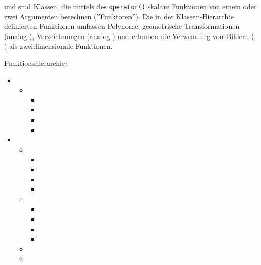 \hypertarget{Funktionen}{}

 und  sind Klassen, die mittels 
des \verb+operator()+ skalare Funktionen von einem oder zwei Argumenten 
berechnen (''Funktoren''). Die in der Klassen-Hierarchie definierten 
Funktionen umfassen Polynome, geometrische Transformationen (analog 
), Verzeichnungen (analog ) und erlauben 
die Verwendung von Bildern (, ) als
zweidimensionale Funktionen.

Funktionshierarchie:
\begin{itemize}
\item {}
\begin{itemize}
\item {}
\begin{itemize}
\item {}
\item {}
\item {}
\item {}
\end{itemize}
\end{itemize}
\item {}
\begin{itemize}
\item {}
\begin{itemize}
\item {}
\item {}
\item {}
\item {}
\end{itemize}
\item {}
\begin{itemize}
\item {}
\item {}
\item {}
\item {}
\end{itemize}
\item {}
\item {}
\end{itemize}
\end{itemize}

